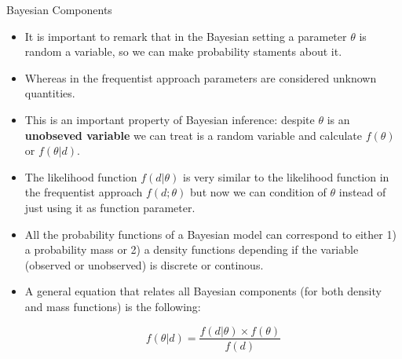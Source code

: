 \documentclass[handout]{beamer}
\begin{document}
\begin{frame}{Bayesian Components}
\scriptsize{
\begin{itemize}

\item It is important to remark that in the Bayesian setting a parameter $\theta$ is random a variable, so we can make probability staments about it.

\item Whereas in the frequentist approach parameters are considered unknown quantities. 

\item This is an important property of Bayesian inference: despite $\theta$ is an \textbf{unobseved variable} we can treat is a random variable and calculate $f(\theta)$ or $f(\theta|d)$.

\item The likelihood function  $f(d|\theta)$ is very similar to the likelihood function in the frequentist approach $f(d;\theta)$ but now we can condition of $\theta$ instead of just using it as function parameter.

\item All the probability functions of a Bayesian model can correspond to either 1) a probability mass or 2) a density functions depending if the variable (observed or unobserved) is discrete or continous.

\item A general equation that relates all Bayesian components (for both density and mass functions) is the following:

\begin{equation}
 f(\theta|d) = \frac{f(d|\theta) \times f(\theta)}{f(d)}
\end{equation}



\end{itemize}
 } 

\end{frame}
\end{document}
